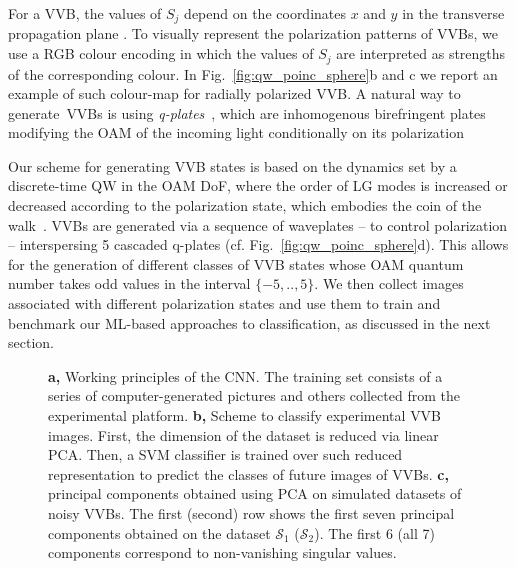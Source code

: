 For a \ac{VVB}, the values of $S_j$ depend on the coordinates $x$ and $y$ in the transverse propagation plane \cite{Cardano:12}.
To visually represent the polarization patterns of \acp{VVB}, we use a RGB colour encoding in which the values of $S_j$ are interpreted as strengths of the corresponding colour. In Fig.~\ref{fig:qw_poinc_sphere}b and c we report an example of such colour-map for radially polarized \ac{VVB}. A natural way to generate~\acp{VVB} is using \emph{q-plates}~\cite{marrucci2006optical,Cardano:12}, which are inhomogenous birefringent plates modifying the OAM of the incoming light conditionally on its polarization 



Our scheme for generating \ac{VVB} states is based on the dynamics set by a discrete-time QW in the OAM DoF, where the order of \ac{LG} modes is increased or decreased according to the polarization state, which embodies the coin of the walk~\cite{zhang-oam-qw-2010,goyal2013implementing,cardano2015quantum,Innocenti2017,giordani_2018}. 
\ac{VVB}s are generated via a sequence of waveplates -- to control polarization -- interspersing 5 cascaded q-plates (cf. Fig.~\ref{fig:qw_poinc_sphere}d). This allows for the generation of different classes of VVB states whose {OAM quantum number} takes odd values in the interval $\{-5,..,5\}$.
We then collect images associated with different polarization states and use them to train and benchmark our \ac{ML}-based approaches to classification, as discussed in the next section. 

\begin{figure}[b]
    \centering
    \caption{
    {\bf a,} 
    Working principles of the \ac{CNN}. The training set consists of a series of computer-generated pictures and others collected from the experimental platform.
    {\bf b,} 
    Scheme to classify experimental \ac{VVB} images. First, the dimension of the dataset is reduced via linear PCA. Then, a SVM classifier is trained over 
    such reduced representation 
    to predict the classes of future images of \ac{VVB}s. {\bf c,} principal components obtained using \ac{PCA} on simulated datasets of noisy \acp{VVB}. The first (second) row shows the first seven principal components obtained on the dataset $\mathcal S_1$ ($\mathcal S_2$). 
    The first 6 (all 7) components correspond to non-vanishing singular values. 
    }
    \label{fig:class_techniques}
\end{figure}



